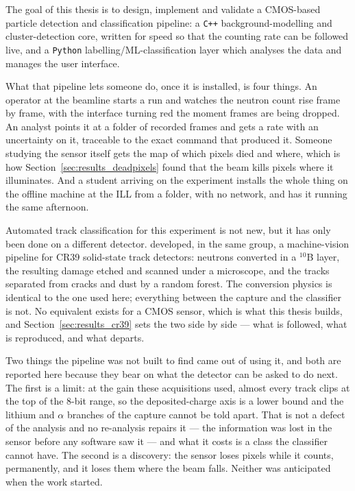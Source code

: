 \documentclass[a4paper,headsepline,oneside,11pt]{scrartcl}
\begin{document}
The goal of this thesis is to design, implement and validate a CMOS-based particle detection and classification pipeline:
a \texttt{C++} background-modelling and cluster-detection core, written for speed so that the counting rate can be followed live, and a \texttt{Python} labelling/ML-classification layer which analyses the data and manages the user interface.

What that pipeline lets someone do, once it is installed, is four things. An
operator at the beamline starts a run and watches the neutron count rise frame
by frame, with the interface turning red the moment frames are being dropped.
An analyst points it at a folder of recorded frames and gets a rate with an
uncertainty on it, traceable to the exact command that produced it. Someone
studying the sensor itself gets the map of which pixels died and where, which is
how Section~\ref{sec:results_deadpixels} found that the beam kills pixels where
it illuminates. And a student arriving on the experiment installs the whole
thing on the offline machine at the ILL from a folder, with no network, and has
it running the same afternoon.

Automated track classification for this experiment is not new, but it has only
been done on a different detector. \cite{Filter2018} developed, in the same
group, a machine-vision pipeline for CR39 solid-state track detectors: neutrons
converted in a $^{10}$B layer, the resulting damage etched and scanned under a
microscope, and the tracks separated from cracks and dust by a random forest.
The conversion physics is identical to the one used here; everything between the
capture and the classifier is not. No equivalent exists for a CMOS sensor, which
is what this thesis builds, and Section~\ref{sec:results_cr39} sets the two side
by side --- what is followed, what is reproduced, and what departs.

Two things the pipeline was not built to find came out of using it, and both
are reported here because they bear on what the detector can be asked to do
next. The first is a limit: at the gain these acquisitions used, almost every
track clips at the top of the 8-bit range, so the deposited-charge axis is a
lower bound and the lithium and $\alpha$ branches of the capture cannot be told
apart. That is not a defect of the analysis and no re-analysis repairs it --- the
information was lost in the sensor before any software saw it --- and what it
costs is a class the classifier cannot have. The second is a discovery: the
sensor loses pixels while it counts, permanently, and it loses them where the
beam falls. Neither was anticipated when the work started.
\end{document}
